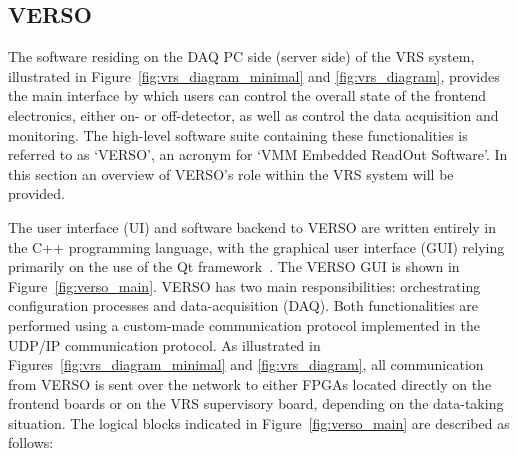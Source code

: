 \subsection{VERSO}
\label{sec:verso}

The software residing on the DAQ PC side (server side) of the VRS system,
illustrated in Figure~\ref{fig:vrs_diagram_minimal} and \ref{fig:vrs_diagram},
provides the main interface by which users can control the overall
state of the frontend electronics, either on- or off-detector,
as well as control the data acquisition and monitoring.
The high-level software suite containing these functionalities is referred
to as `VERSO', an acronym for `VMM Embedded ReadOut Software'.
In this section an overview of VERSO's role within the VRS system will be provided.

The user interface (UI) and software backend to VERSO are written entirely in the C++ programming language,
with the graphical user interface (GUI) relying primarily on the use of the Qt framework~\cite{QtCompany}.
The VERSO GUI is shown in Figure~\ref{fig:verso_main}.
VERSO has two main responsibilities: orchestrating configuration processes and
data-acquisition (DAQ).
Both functionalities are performed using a custom-made communication protocol
implemented in the UDP/IP communication protocol.
As illustrated in Figures~\ref{fig:vrs_diagram_minimal} and \ref{fig:vrs_diagram},
all communication from VERSO is sent over the network to either FPGAs located directly
on the frontend boards or on the VRS supervisory board, depending on the
data-taking situation.
The logical blocks indicated in Figure~\ref{fig:verso_main} are described as follows:

